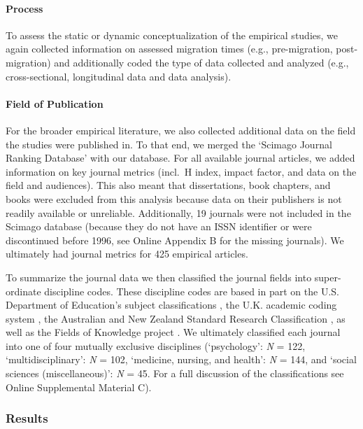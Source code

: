 \documentclass[man, 12pt, a4paper, mask]{apa7}
\begin{document}
\paragraph{Process}

To assess the static or dynamic conceptualization of the empirical
studies, we again collected information on assessed migration times
(e.g., pre-migration, post-migration) and additionally coded the type of
data collected and analyzed (e.g., cross-sectional, longitudinal data
and data analysis).

\paragraph{Field of Publication}

For the broader empirical literature, we also collected additional data
on the field the studies were published in. To that end, we merged the
`Scimago Journal Ranking Database' \citep{SCImago2020} with our
database. For all available journal articles, we added information on
key journal metrics (incl.~H index, impact factor, and data on the field
and audiences). This also meant that dissertations, book chapters, and
books were excluded from this analysis because data on their publishers
is not readily available or unreliable. Additionally, 19 journals were
not included in the Scimago database (because they do not have an ISSN
identifier or were discontinued before 1996, see Online Appendix B for
the missing journals). We ultimately had journal metrics for 425
empirical articles.

To summarize the journal data we then classified the journal fields into
super-ordinate discipline codes. These discipline codes are based in
part on the U.S. Department of Education's subject classifications
\citep[i.e., CIP,][]{InstituteofEducationSciences2020}, the U.K.
academic coding system
\citep[JACS 3.0,][]{HigherEducationStatisticsAgency2013}, the Australian
and New Zealand Standard Research Classification
\citep[ANZSRC 2020,][]{AustralianBureauofStatistics2020}, as well as the
Fields of Knowledge project \citep{ThingsmadeThinkable2014}. We
ultimately classified each journal into one of four mutually exclusive
disciplines (`psychology': \textit{N} = 122, `multidisciplinary':
\textit{N} = 102, `medicine, nursing, and health': \textit{N} = 144, and
`social sciences (miscellaneous)': \textit{N} = 45. For a full
discussion of the classifications see Online Supplemental Material C).

\subsubsection{Results}
\end{document}
